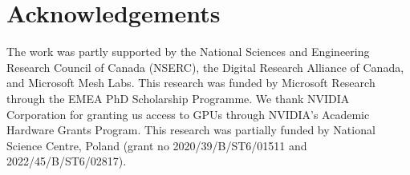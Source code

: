 \section{Acknowledgements}
  \label{sec:blendfields-acknowledgements}
  The work was partly supported by the National Sciences and Engineering
  Research Council of Canada (NSERC), the Digital Research Alliance of Canada,
  and Microsoft Mesh Labs.
  This research was funded by Microsoft Research through the EMEA PhD
  Scholarship Programme.
  We thank NVIDIA Corporation for granting us access to GPUs through NVIDIA's
  Academic Hardware Grants Program.
  This research was partially funded by National Science Centre, Poland (grant
  no 2020/39/B/ST6/01511 and 2022/45/B/ST6/02817).
